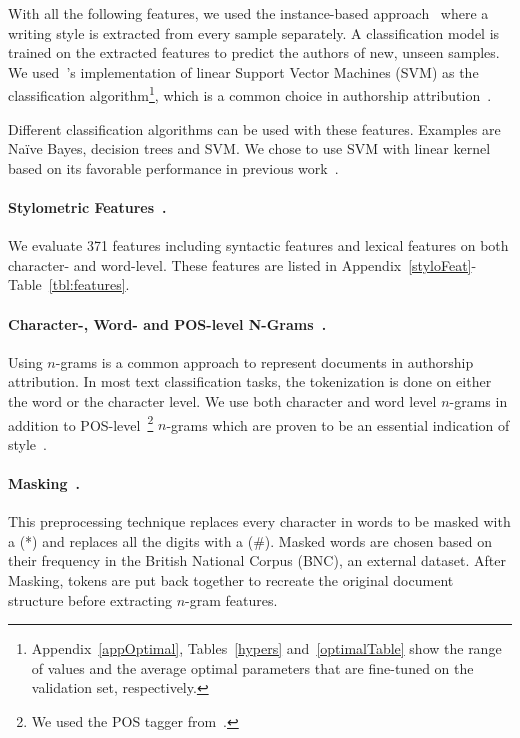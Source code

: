 \documentclass[11pt]{article}
\begin{document}
With all the following features, we used the instance-based approach~\citep{Stamatatos.e:2009} where a writing style is extracted from every sample separately. A classification model is trained on the extracted features to predict the authors of new, unseen samples. We used~\citet{scikit-learn}'s implementation of linear Support Vector Machines (SVM) as the classification algorithm\footnote{Appendix~\ref{appOptimal}, Tables~\ref{hypers} and~\ref{optimalTable} show the range of values and the average optimal parameters that are fine-tuned on the validation set, respectively.}, which is a common choice in authorship attribution~\citep{Stamatatos.E:2017}. 

Different classification algorithms can be used with these features. Examples are Na\"ive Bayes, decision trees and SVM. We chose to use SVM with linear kernel based on its favorable performance in previous work~\citep{Sapkota.U:2014,sapkota2015not,Ding.S:2015,Stamatatos.E:2017,stamatatos2018masking}. 

\paragraph{Stylometric Features~\citep{Iqbal.F:2008,Iqbal.F:2013}.}
We evaluate 371 features including syntactic features and lexical features on both character- and word-level. These features are listed in Appendix~\ref{styloFeat}-Table~\ref{tbl:features}.

\paragraph{Character-, Word- and POS-level N-Grams~\citep{Stamatatos.E:2013,Sapkota.U:2014,sapkota2015not}.}
Using $n$-grams is a common approach to represent documents in authorship attribution. In most text classification tasks, the tokenization is done on either the word or the character level. We use both character and word level $n$-grams in addition to POS-level~\footnote{We used the POS tagger from~\citep{manning2014stanford}.} $n$-grams which are proven to be an essential indication of style~\citep{Ding.S:2015,sundararajan2018represents}. 

\paragraph{Masking~\citep{Stamatatos.E:2017,stamatatos2018masking}.}
This preprocessing technique replaces every character in words to be masked with a (*) and replaces all the digits with a ($\#$). Masked words are chosen based on their frequency in the British National Corpus (BNC), an external dataset. After Masking, tokens are put back together to recreate the original document structure before extracting $n$-gram features. 
\end{document}
